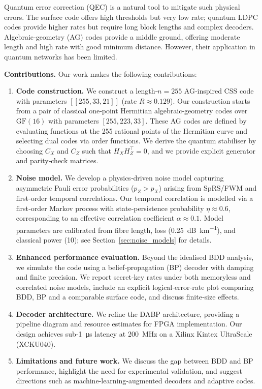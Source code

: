 \documentclass[conference]{IEEEtran}
\begin{document}
    Quantum error correction (QEC) is a natural tool to mitigate such physical errors.  The surface code offers high 
thresholds but very low rate; quantum LDPC codes provide higher rates but require long block lengths and complex 
decoders.  Algebraic‑geometry (AG) codes provide a middle ground, offering moderate length and high rate with good 
minimum distance.  However, their application in quantum networks has been limited.

    \textbf{Contributions.} Our work makes the following contributions:

    \begin{enumerate}[leftmargin=*,itemsep=1pt,topsep=2pt]
      \item \textbf{Code construction.}  We construct a length‑$n=255$ AG‑inspired CSS code with parameters 
$[[255,33,21]]$ (rate $R\approx 0.129$).  Our construction starts from a pair of classical one‑point Hermitian 
algebraic‑geometry codes over $\mathrm{GF}(16)$ with parameters $[255,223,33]$.  These AG codes are defined by 
evaluating functions at the 255 rational points of the Hermitian curve and selecting dual codes via order functions.  We
 derive the quantum stabiliser by choosing $C_X$ and $C_Z$ such that $H_X H_Z^\top=0$, and we provide explicit generator
 and parity‑check matrices.
      \item \textbf{Noise model.}  We develop a physics‑driven noise model capturing asymmetric Pauli error 
probabilities ($p_Z>p_X$) arising from SpRS/FWM and first‑order temporal correlations.  Our temporal correlation is 
modelled via a first‑order Markov process with state‑persistence probability $\eta\approx 0.6$, corresponding to an 
effective correlation coefficient $\alpha\approx 0.1$.  Model parameters are calibrated from fibre length, loss 
(\SI{0.25}{\dB\per\kilo\meter}), and classical power (\SI{10}{\dBm}); see Section~\ref{sec:noise_models} for details.
      \item \textbf{Enhanced performance evaluation.}  Beyond the idealised BDD analysis, we simulate the code using a 
belief‑propagation (BP) decoder with damping and finite precision.  We report secret‑key rates under both memoryless and
  correlated noise models, include an explicit logical‑error‑rate plot comparing BDD, BP and a comparable surface code, 
and discuss finite‑size effects.
      \item \textbf{Decoder architecture.}  We refine the DABP architecture, providing a pipeline diagram and resource 
estimates for FPGA implementation.  Our design achieves sub‑\SI{1}{\micro\second} latency at \SI{200}{\mega\hertz} on a 
Xilinx Kintex UltraScale (XCKU040).
      \item \textbf{Limitations and future work.}  We discuss the gap between BDD and BP performance, highlight the need
  for experimental validation, and suggest directions such as machine‑learning‑augmented decoders and adaptive codes.
    \end{enumerate}
\end{document}

